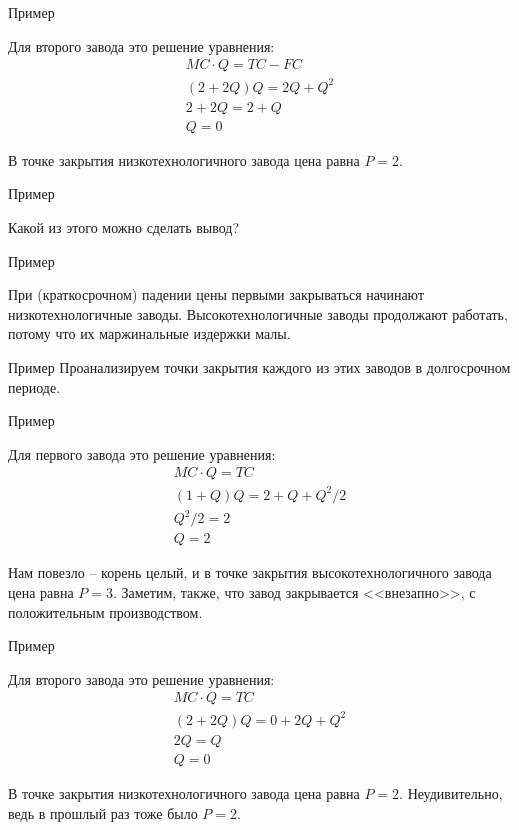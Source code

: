 \documentclass{beamer}
\begin{document}
\begin{frame}{Пример}

Для второго завода это решение уравнения:
\begin{gather*}
MC \cdot Q = TC - FC\\
(2+2Q) Q = 2Q + Q^2 \\
2+2Q = 2+Q\\
Q = 0
\end{gather*}

В точке закрытия низкотехнологичного завода цена равна $P=2$.
	
\end{frame}

\begin{frame}{Пример}

Какой из этого можно сделать вывод?
	
\end{frame}

\begin{frame}{Пример}

При (краткосрочном) падении цены первыми закрываться начинают низкотехнологичные заводы. Высокотехнологичные заводы продолжают работать, потому что их маржинальные издержки малы.
	
\end{frame}

\begin{frame}{Пример}
Проанализируем точки закрытия каждого из этих заводов \alert{в долгосрочном периоде}.
\end{frame}

\begin{frame}{Пример}
	
Для первого завода это решение уравнения:
\begin{gather*}
MC \cdot Q = TC\\
(1+Q) Q = 2 + Q + Q^2/2 \\
Q^2/2 = 2\\
Q = 2
\end{gather*}

Нам повезло – корень целый, и в точке закрытия высокотехнологичного завода цена равна $P=3$. Заметим, также, что завод закрывается <<внезапно>>, с положительным производством.
	
\end{frame}

\begin{frame}{Пример}

Для второго завода это решение уравнения:
\begin{gather*}
MC \cdot Q = TC\\
(2+2Q) Q = 0 + 2Q + Q^2 \\
2Q = Q\\
Q = 0
\end{gather*}

В точке закрытия низкотехнологичного завода цена равна $P=2$. Неудивительно, ведь в прошлый раз тоже было $P=2$.
	
\end{frame}
\end{document}
